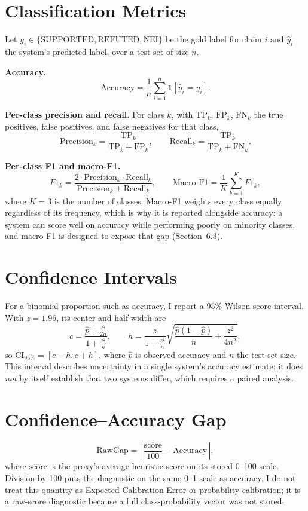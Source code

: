 \documentclass[12pt,a4paper,openany]{report}
\begin{document}
\section{Classification Metrics}
Let $y_i \in \{\mathrm{SUPPORTED}, \mathrm{REFUTED}, \mathrm{NEI}\}$ be the gold label for claim $i$ and $\hat y_i$ the system's predicted label, over a test set of size $n$.

\textbf{Accuracy.}
\[
\mathrm{Accuracy} = \frac{1}{n}\sum_{i=1}^{n} \mathbf{1}[\hat y_i = y_i].
\]

\textbf{Per-class precision and recall.} For class $k$, with $\mathrm{TP}_k$, $\mathrm{FP}_k$, $\mathrm{FN}_k$ the true positives, false positives, and false negatives for that class,
\[
\mathrm{Precision}_k = \frac{\mathrm{TP}_k}{\mathrm{TP}_k + \mathrm{FP}_k}, \qquad
\mathrm{Recall}_k = \frac{\mathrm{TP}_k}{\mathrm{TP}_k + \mathrm{FN}_k}.
\]

\textbf{Per-class F1 and macro-F1.}
\[
F1_k = \frac{2 \cdot \mathrm{Precision}_k \cdot \mathrm{Recall}_k}{\mathrm{Precision}_k + \mathrm{Recall}_k}, \qquad
\mathrm{Macro\text{-}F1} = \frac{1}{K}\sum_{k=1}^{K} F1_k,
\]
where $K=3$ is the number of classes. Macro-F1 weights every class equally regardless of its frequency, which is why it is reported alongside accuracy: a system can score well on accuracy while performing poorly on minority classes, and macro-F1 is designed to expose that gap (Section~6.3).

\section{Confidence Intervals}
For a binomial proportion such as accuracy, I report a 95\% Wilson score interval. With $z=1.96$, its center and half-width are
\[
c=\frac{\hat p+\frac{z^2}{2n}}{1+\frac{z^2}{n}},\qquad
h=\frac{z}{1+\frac{z^2}{n}}
\sqrt{\frac{\hat p(1-\hat p)}{n}+\frac{z^2}{4n^2}},
\]
so $\mathrm{CI}_{95\%}=[c-h,c+h]$, where $\hat p$ is observed accuracy and $n$ the test-set size. This interval describes uncertainty in a single system's accuracy estimate; it does \emph{not} by itself establish that two systems differ, which requires a paired analysis.

\section{Confidence--Accuracy Gap}
\[
\mathrm{RawGap} = \left|\, \frac{\overline{\mathrm{score}}}{100} - \mathrm{Accuracy} \,\right|,
\]
where $\overline{\mathrm{score}}$ is the proxy's average heuristic score on its stored 0--100 scale. Division by 100 puts the diagnostic on the same 0--1 scale as accuracy. I do not treat this quantity as Expected Calibration Error or probability calibration; it is a raw-score diagnostic because a full class-probability vector was not stored.
\end{document}
